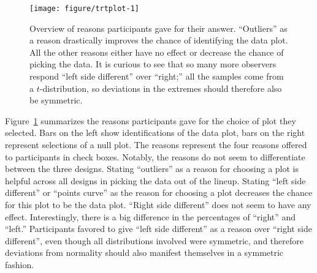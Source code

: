\documentclass{article}\usepackage[]{graphicx}\usepackage[]{color}
\newenvironment{knitrout}{}{} %
\newcommand{\hhnote}[1]{\todo[inline,color=magenta!40]{#1}}
\begin{document}
\begin{figure}[hbt]
\centering
\begin{knitrout}
\color{fgcolor}
\texttt{[image: figure/trtplot-1]} 

\end{knitrout}
\caption{\label{fig:choices}Overview of reasons participants gave for  their answer. ``Outliers'' as a reason drastically improves the chance of identifying the data plot. All the other reasons either have no effect or decrease the chance of picking the data. It is curious to see that so many more observers respond ``left side different'' over ``right;''  all the samples  come from a  $t$-distribution, so deviations in the extremes should therefore also be symmetric.}
\end{figure}

Figure~\ref{fig:choices} summarizes the reasons participants gave for the choice of plot they selected. Bars on the left show  identifications of the data plot, bars on the right represent selections of a null plot. The reasons represent the four reasons offered  to participants in check boxes. Notably, the reasons do not seem to differentiate between the three designs. Stating ``outliers'' as a reason for choosing a plot is helpful across all designs in picking the data out of the lineup. Stating ``left side different'' or ``points curve''  as the reason for choosing a plot decreases the chance for this plot to be the data plot. ``Right side different'' does not seem to have any effect. Interestingly, there is a big difference in the percentages of ``right'' and ``left.'' Participants favored to give ``left side different'' as a reason over ``right side different'', even though all distributions involved were symmetric, and therefore deviations from normality should also manifest themselves in a symmetric fashion.


\end{document}
